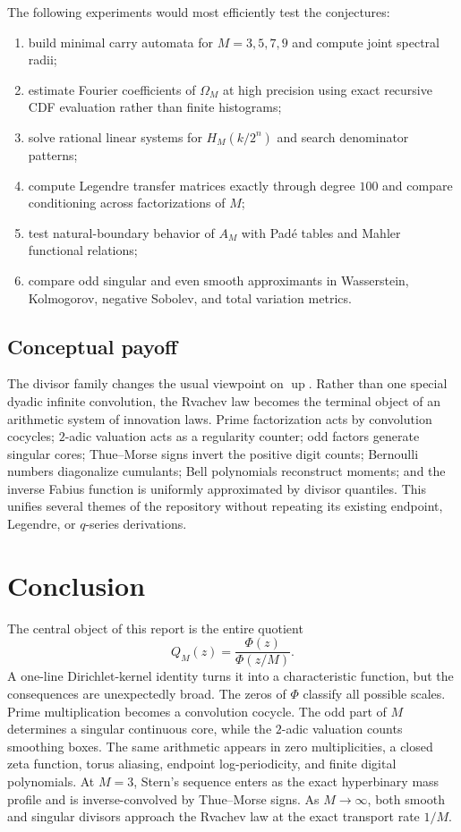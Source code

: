\documentclass[11pt,oneside]{article}
\theoremstyle{definition}
\theoremstyle{remark}
\newcommand{\Up}{\operatorname{up}}
\numberwithin{equation}{section}
\newcommand{\1}{\mathbf 1}
\begin{document}
The following experiments would most efficiently test the conjectures:
\begin{enumerate}
\item build minimal carry automata for $M=3,5,7,9$ and compute joint spectral radii;
\item estimate Fourier coefficients of $\Omega_M$ at high precision using exact recursive
CDF evaluation rather than finite histograms;
\item solve rational linear systems for $H_M(k/2^n)$ and search denominator patterns;
\item compute Legendre transfer matrices exactly through degree $100$ and compare
conditioning across factorizations of $M$;
\item test natural-boundary behavior of $A_M$ with Pad\'e tables and Mahler functional
relations;
\item compare odd singular and even smooth approximants in Wasserstein, Kolmogorov,
negative Sobolev, and total variation metrics.
\end{enumerate}

\subsection{Conceptual payoff}

The divisor family changes the usual viewpoint on $\Up$.  Rather than one special dyadic
infinite convolution, the Rvachev law becomes the terminal object of an arithmetic system of
innovation laws.  Prime factorization acts by convolution cocycles; $2$-adic valuation acts
as a regularity counter; odd factors generate singular cores; Thue--Morse signs invert the
positive digit counts; Bernoulli numbers diagonalize cumulants; Bell polynomials reconstruct
moments; and the inverse Fabius function is uniformly approximated by divisor quantiles.
This unifies several themes of the repository without repeating its existing endpoint,
Legendre, or $q$-series derivations.

\section{Conclusion}
\label{sec:conclusion}

The central object of this report is the entire quotient
\[
 Q_M(z)=\frac{\Phi(z)}{\Phi(z/M)}.
\]
A one-line Dirichlet-kernel identity turns it into a characteristic function, but the
consequences are unexpectedly broad.  The zeros of $\Phi$ classify all possible scales.
Prime multiplication becomes a convolution cocycle.  The odd part of $M$ determines a
singular continuous core, while the $2$-adic valuation counts smoothing boxes.  The same
arithmetic appears in zero multiplicities, a closed zeta function, torus aliasing, endpoint
log-periodicity, and finite digital polynomials.  At $M=3$, Stern's sequence enters as the
exact hyperbinary mass profile and is inverse-convolved by Thue--Morse signs.  As
$M\to\infty$, both smooth and singular divisors approach the Rvachev law at the exact
transport rate $1/M$.
\end{document}
